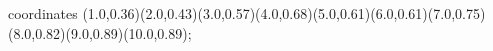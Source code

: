 					coordinates { (1.0,0.36)(2.0,0.43)(3.0,0.57)(4.0,0.68)(5.0,0.61)(6.0,0.61)(7.0,0.75)(8.0,0.82)(9.0,0.89)(10.0,0.89)};